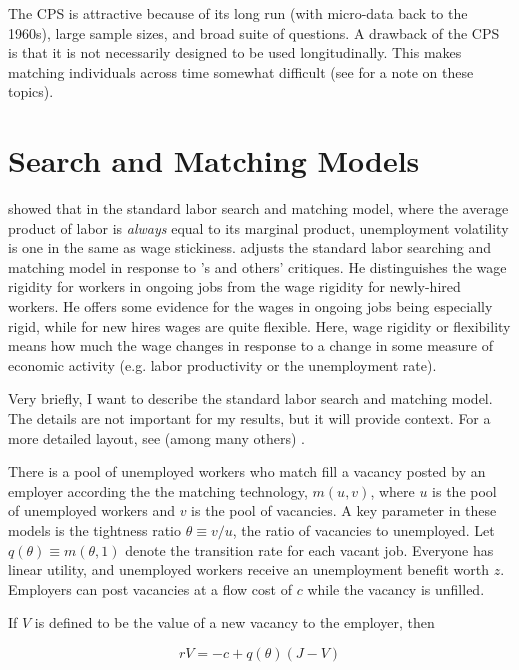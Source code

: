 \documentclass[11pt]{article}
\begin{document}
The CPS is attractive because of its long run (with micro-data back to the 1960s), large sample sizes, and broad suite of questions.
A drawback of the CPS is that it is not necessarily designed to be used longitudinally.
This makes matching individuals across time somewhat difficult (see \cite{madrian1999note} for a note on these topics).

\section{Search and Matching Models}
\label{sec:search_and_matching_models}

\cite{hall_milgrom_2008} showed that in the standard labor search and matching model, where the average product of labor is \emph{always} equal to its marginal product, unemployment volatility is one in the same as wage stickiness.
\cite{pissarides_2009} adjusts the standard labor searching and matching model in response to \cite{shimer_2005}'s and others' critiques.
He distinguishes the wage rigidity for workers in ongoing jobs from the wage rigidity for newly-hired workers.
He offers some evidence for the wages in ongoing jobs being especially rigid, while for new hires wages are quite flexible.
Here, wage rigidity or flexibility means how much the wage changes in response to a change in some measure of economic activity (e.g. labor productivity or the unemployment rate).

Very briefly, I want to describe the standard labor search and matching model.
The details are not important for my results, but it will provide context.
For a more detailed layout, see (among many others) \cite{pissarides_2009}.

There is a pool of unemployed workers who match fill a vacancy posted by an employer according the the matching technology, $m(u, v)$,
where $u$ is the pool of unemployed workers and $v$ is the pool of vacancies.
A key parameter in these models is the tightness ratio $\theta \equiv v/u$, the ratio of vacancies to unemployed.
Let $q(\theta) \equiv m(\theta, 1)$ denote the transition rate for each vacant job.
Everyone has linear utility, and unemployed workers receive an unemployment benefit worth $z$.
Employers can post vacancies at a flow cost of $c$ while the vacancy is unfilled.

If $V$ is defined to be the value of a new vacancy to the employer, then

\begin{equation}
    rV = -c + q(\theta)(J - V)
\end{equation}
\end{document}

